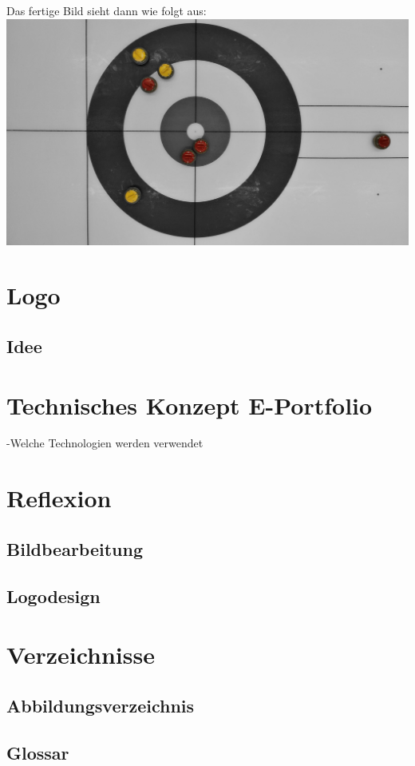 \documentclass[11pt]{article}
\begin{document}
    Das fertige Bild sieht dann wie folgt aus:\\
    \includegraphics[width=\textwidth]{media/edited}


    \section{Logo}

    \subsection{Idee}

    \section{Technisches Konzept E-Portfolio}
    -Welche Technologien werden verwendet

    \section{Reflexion}

    \subsection{Bildbearbeitung}

    \subsection{Logodesign}

    \section{Verzeichnisse}

    \subsection{Abbildungsverzeichnis}

    \subsection{Glossar}
\end{document}
